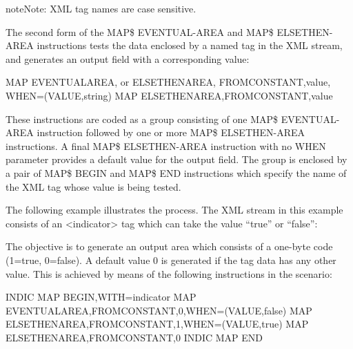 \documentclass[letterpaper,10pt,english]{sphinxmanual}
\begin{document}
\begin{sphinxadmonition}{note}{Note:}
XML tag names are case sensitive.
\end{sphinxadmonition}

The second form of the MAP\$ EVENTUAL-AREA and MAP\$ ELSETHEN-AREA instructions tests the data enclosed by a
named tag in the XML stream, and generates an output field with a corresponding value:

\begin{sphinxVerbatim}[commandchars=\\\{\}]
MAP\PYGZdl{} EVENTUAL\PYGZhy{}AREA, or ELSETHEN\PYGZhy{}AREA,
    FROM\PYGZhy{}CONSTANT,\PYGZsq{}value\PYGZsq{},
    WHEN=(VALUE,\PYGZsq{}string\PYGZsq{})
MAP\PYGZdl{} ELSETHEN\PYGZhy{}AREA,FROM\PYGZhy{}CONSTANT,\PYGZsq{}value\PYGZsq{}
\end{sphinxVerbatim}

These instructions are coded as a group consisting of one MAP\$ EVENTUAL-AREA instruction followed by one or more
MAP\$ ELSETHEN-AREA instructions. A final MAP\$ ELSETHEN-AREA instruction with no WHEN parameter provides a
default value for the output field. The group is enclosed by a pair of MAP\$ BEGIN and MAP\$ END instructions which
specify the name of the XML tag whose value is being tested.

The following example illustrates the process. The XML stream in this example consists of an \textless{}indicator\textgreater{} tag which can
take the value “true” or “false”:

\begin{sphinxVerbatim}[commandchars=\\\{\}]
\end{sphinxVerbatim}

The objective is to generate an output area which consists of a one-byte code (1=true, 0=false). A default value 0 is
generated if the tag data has any other value. This is achieved by means of the following instructions in the scenario:

\begin{sphinxVerbatim}[commandchars=\\\{\}]
INDIC MAP\PYGZdl{} BEGIN,WITH=\PYGZsq{}indicator\PYGZsq{}
MAP\PYGZdl{} EVENTUAL\PYGZhy{}AREA,FROM\PYGZhy{}CONSTANT,\PYGZsq{}0\PYGZsq{},WHEN=(VALUE,\PYGZsq{}false\PYGZsq{})
MAP\PYGZdl{} ELSETHEN\PYGZhy{}AREA,FROM\PYGZhy{}CONSTANT,\PYGZsq{}1\PYGZsq{},WHEN=(VALUE,\PYGZsq{}true\PYGZsq{})
MAP\PYGZdl{} ELSETHEN\PYGZhy{}AREA,FROM\PYGZhy{}CONSTANT,\PYGZsq{}0\PYGZsq{}
INDIC MAP\PYGZdl{} END
\end{sphinxVerbatim}
\end{document}
